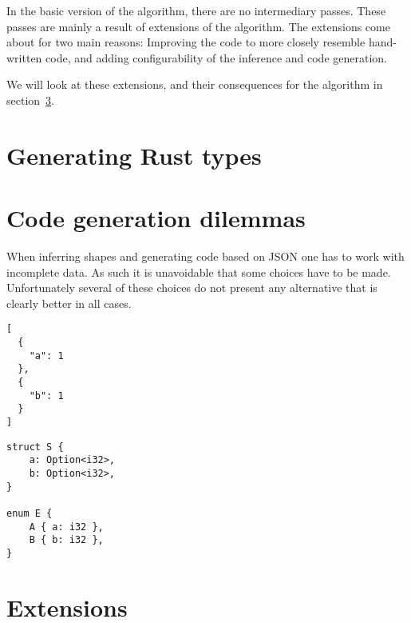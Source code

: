 In the basic version of the algorithm, there are no intermediary passes. These passes are mainly a result of extensions of the algorithm. The extensions come about for two main reasons: Improving the code to more closely resemble hand-written code, and adding configurability of the inference and code generation.

We will look at these extensions, and their consequences for the algorithm in section~\ref{sec:extensions}.

\section{Generating Rust types}

\section{Code generation dilemmas}
\label{sec:design-considerations}

When inferring shapes and generating code based on JSON one has to work with incomplete data. As such it is unavoidable that some choices have to be made. Unfortunately several of these choices do not present any alternative that is clearly better in all cases.




\begin{listing}[ht!]
\begin{verbatim}
[
  {
    "a": 1
  },
  {
    "b": 1
  }
]
\end{verbatim}
\caption{JSON Dilemma \#1}
\label{lst:json-dilemma-1}
\end{listing}

\begin{listing}[ht!]
\begin{verbatim}
struct S {
    a: Option<i32>,
    b: Option<i32>,
}

enum E {
    A { a: i32 },
    B { b: i32 },
}
\end{verbatim}
\caption{JSON Dilemma \#1 - Two solutions}
\label{lst:json-dilemma-1-rs}
\end{listing}

\section{Extensions}
\label{sec:extensions}





